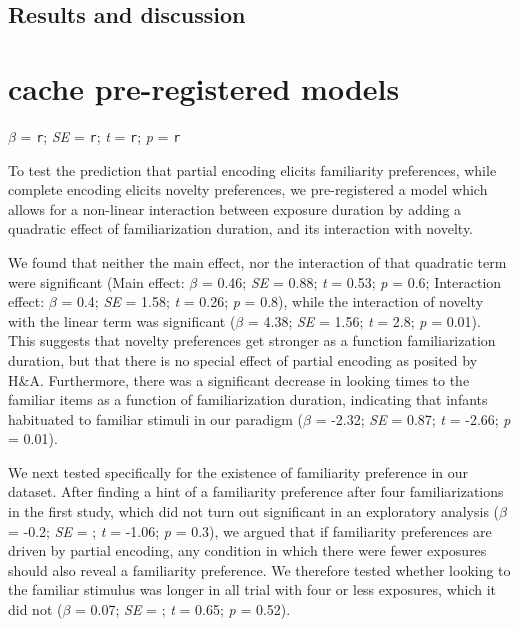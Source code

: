 \documentclass[10pt, letterpaper]{article}
\begin{document}
\hypertarget{results-and-discussion-1}{%
\subsection{Results and discussion}\label{results-and-discussion-1}}

\hypertarget{cache-pre-registered-models}{%
\section{cache pre-registered
models}\label{cache-pre-registered-models}}

\(\beta\) = \texttt{r}; \emph{SE} = \texttt{r}; \emph{t} = \texttt{r};
\emph{p} = \texttt{r}

To test the prediction that partial encoding elicits familiarity
preferences, while complete encoding elicits novelty preferences, we
pre-registered a model which allows for a non-linear interaction between
exposure duration by adding a quadratic effect of familiarization
duration, and its interaction with novelty.

We found that neither the main effect, nor the interaction of that
quadratic term were significant (Main effect: \(\beta\) = 0.46;
\emph{SE} = 0.88; \emph{t} = 0.53; \emph{p} = 0.6; Interaction effect:
\(\beta\) = 0.4; \emph{SE} = 1.58; \emph{t} = 0.26; \emph{p} = 0.8),
while the interaction of novelty with the linear term was significant
(\(\beta\) = 4.38; \emph{SE} = 1.56; \emph{t} = 2.8; \emph{p} = 0.01).
This suggests that novelty preferences get stronger as a function
familiarization duration, but that there is no special effect of partial
encoding as posited by H\&A. Furthermore, there was a significant
decrease in looking times to the familiar items as a function of
familiarization duration, indicating that infants habituated to familiar
stimuli in our paradigm (\(\beta\) = -2.32; \emph{SE} = 0.87; \emph{t} =
-2.66; \emph{p} = 0.01).

We next tested specifically for the existence of familiarity preference
in our dataset. After finding a hint of a familiarity preference after
four familiarizations in the first study, which did not turn out
significant in an exploratory analysis (\(\beta\) = -0.2; \emph{SE} = ;
\emph{t} = -1.06; \emph{p} = 0.3), we argued that if familiarity
preferences are driven by partial encoding, any condition in which there
were fewer exposures should also reveal a familiarity preference. We
therefore tested whether looking to the familiar stimulus was longer in
all trial with four or less exposures, which it did not (\(\beta\) =
0.07; \emph{SE} = ; \emph{t} = 0.65; \emph{p} = 0.52).
\end{document}

